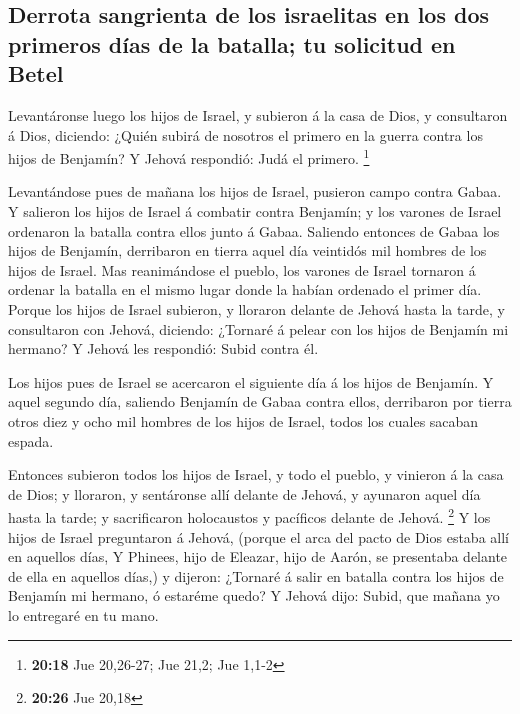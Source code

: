 \hypertarget{derrota-sangrienta-de-los-israelitas-en-los-dos-primeros-duxedas-de-la-batalla-tu-solicitud-en-betel}{%
\subsection{Derrota sangrienta de los israelitas en los dos primeros
días de la batalla; tu solicitud en
Betel}\label{derrota-sangrienta-de-los-israelitas-en-los-dos-primeros-duxedas-de-la-batalla-tu-solicitud-en-betel}}

 Levantáronse luego los hijos de Israel, y subieron á la
casa de Dios, y consultaron á Dios, diciendo: ¿Quién subirá de nosotros
el primero en la guerra contra los hijos de Benjamín? Y Jehová
respondió: Judá el primero. \footnote{\textbf{20:18} Jue 20,26-27; Jue
  21,2; Jue 1,1-2}

 Levantándose pues de mañana los hijos de Israel,
pusieron campo contra Gabaa.  Y salieron los hijos de
Israel á combatir contra Benjamín; y los varones de Israel ordenaron la
batalla contra ellos junto á Gabaa.  Saliendo entonces de
Gabaa los hijos de Benjamín, derribaron en tierra aquel día veintidós
mil hombres de los hijos de Israel.  Mas reanimándose el
pueblo, los varones de Israel tornaron á ordenar la batalla en el mismo
lugar donde la habían ordenado el primer día.  Porque los
hijos de Israel subieron, y lloraron delante de Jehová hasta la tarde, y
consultaron con Jehová, diciendo: ¿Tornaré á pelear con los hijos de
Benjamín mi hermano? Y Jehová les respondió: Subid contra él.

 Los hijos pues de Israel se acercaron el siguiente día á
los hijos de Benjamín.  Y aquel segundo día, saliendo
Benjamín de Gabaa contra ellos, derribaron por tierra otros diez y ocho
mil hombres de los hijos de Israel, todos los cuales sacaban espada.

 Entonces subieron todos los hijos de Israel, y todo el
pueblo, y vinieron á la casa de Dios; y lloraron, y sentáronse allí
delante de Jehová, y ayunaron aquel día hasta la tarde; y sacrificaron
holocaustos y pacíficos delante de Jehová. \footnote{\textbf{20:26} Jue
  20,18}  Y los hijos de Israel preguntaron á Jehová,
(porque el arca del pacto de Dios estaba allí en aquellos días,
 Y Phinees, hijo de Eleazar, hijo de Aarón, se presentaba
delante de ella en aquellos días,) y dijeron: ¿Tornaré á salir en
batalla contra los hijos de Benjamín mi hermano, ó estaréme quedo? Y
Jehová dijo: Subid, que mañana yo lo entregaré en tu mano.


